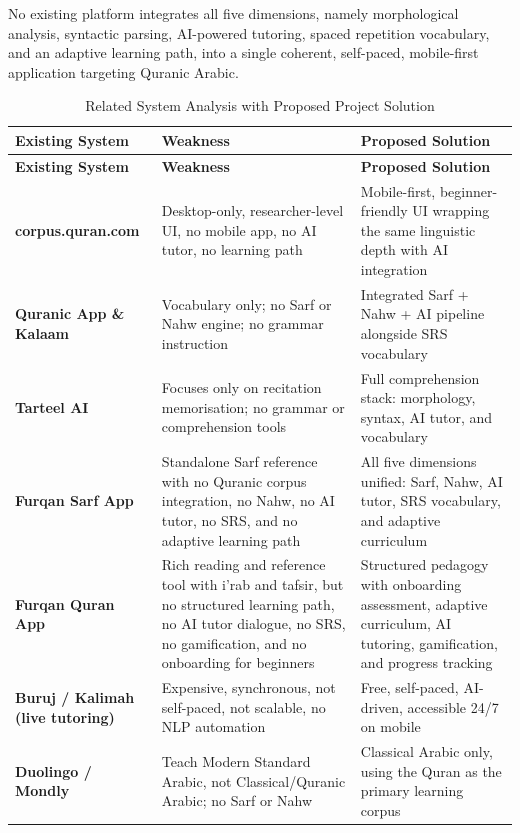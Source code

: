 \documentclass[A4paper,12pt]{article}
\begin{document}
No existing platform integrates all five dimensions, namely morphological analysis, syntactic
parsing, AI-powered tutoring, spaced repetition vocabulary, and an adaptive learning path, into
a single coherent, self-paced, mobile-first application targeting Quranic Arabic.

\vspace{1em}
\begin{longtable}{|>{\bfseries}p{3.5cm}|p{5cm}|p{5cm}|}
    \caption{Related System Analysis with Proposed Project Solution} \\
    \hline
    \textbf{Existing System} & \textbf{Weakness} & \textbf{Proposed Solution} \\
    \hline
    \endfirsthead
    \hline
    \textbf{Existing System} & \textbf{Weakness} & \textbf{Proposed Solution} \\
    \hline
    \endhead
    \hline
    \endfoot
    corpus.quran.com
        & Desktop-only, researcher-level UI, no mobile app, no AI tutor, no learning path
        & Mobile-first, beginner-friendly UI wrapping the same linguistic depth with AI integration \\[0.5em]
    \hline
    Quranic App \& Kalaam
        & Vocabulary only; no Sarf or Nahw engine; no grammar instruction
        & Integrated Sarf + Nahw + AI pipeline alongside SRS vocabulary \\[0.5em]
    \hline
    Tarteel AI
        & Focuses only on recitation memorisation; no grammar or comprehension tools
        & Full comprehension stack: morphology, syntax, AI tutor, and vocabulary \\[0.5em]
    \hline
    Furqan Sarf App
        & Standalone Sarf reference with no Quranic corpus integration, no Nahw, no AI tutor, no SRS, and no adaptive learning path
        & All five dimensions unified: Sarf, Nahw, AI tutor, SRS vocabulary, and adaptive curriculum \\[0.5em]
    \hline
    Furqan Quran App
        & Rich reading and reference tool with i'rab and tafsir, but no structured learning path, no AI tutor dialogue, no SRS, no gamification, and no onboarding for beginners
        & Structured pedagogy with onboarding assessment, adaptive curriculum, AI tutoring, gamification, and progress tracking \\[0.5em]
    \hline
    Buruj / Kalimah (live tutoring)
        & Expensive, synchronous, not self-paced, not scalable, no NLP automation
        & Free, self-paced, AI-driven, accessible 24/7 on mobile \\[0.5em]
    \hline
    Duolingo / Mondly
        & Teach Modern Standard Arabic, not Classical/Quranic Arabic; no Sarf or Nahw
        & Classical Arabic only, using the Quran as the primary learning corpus \\
\end{longtable}
\newpage
\end{document}
